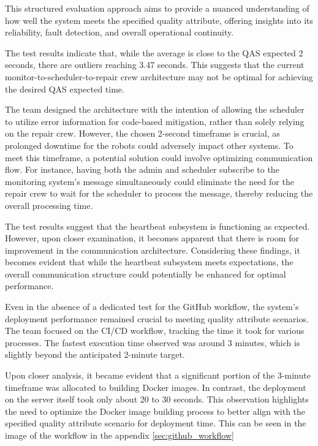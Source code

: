 This structured evaluation approach aims to provide a nuanced understanding of how well the system meets the specified quality attribute, offering insights into its reliability, fault detection, and overall operational continuity.

The test results indicate that, while the average is close to the QAS expected 2 seconds, there are outliers reaching 3.47 seconds. This suggests that the current monitor-to-scheduler-to-repair crew architecture may not be optimal for achieving the desired QAS expected time.

The team designed the architecture with the intention of allowing the scheduler to utilize error information for code-based mitigation, rather than solely relying on the repair crew. However, the chosen 2-second timeframe is crucial, as prolonged downtime for the robots could adversely impact other systems. To meet this timeframe, a potential solution could involve optimizing communication flow. For instance, having both the admin and scheduler subscribe to the monitoring system's message simultaneously could eliminate the need for the repair crew to wait for the scheduler to process the message, thereby reducing the overall processing time.

The test results suggest that the heartbeat subsystem is functioning as expected. However, upon closer examination, it becomes apparent that there is room for improvement in the communication architecture. Considering these findings, it becomes evident that while the heartbeat subsystem meets expectations, the overall communication structure could potentially be enhanced for optimal performance. 

Even in the absence of a dedicated test for the GitHub workflow, the system's deployment performance remained crucial to meeting quality attribute scenarios. The team focused on the CI/CD workflow, tracking the time it took for various processes. The fastest execution time observed was around 3 minutes, which is slightly beyond the anticipated 2-minute target.

Upon closer analysis, it became evident that a significant portion of the 3-minute timeframe was allocated to building Docker images. In contrast, the deployment on the server itself took only about 20 to 30 seconds. This observation highlights the need to optimize the Docker image building process to better align with the specified quality attribute scenario for deployment time. This can be seen in the image of the workflow in the appendix \ref{sec:github_workflow}


